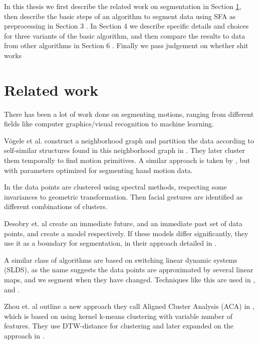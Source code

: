 In this thesis  we first describe the related work on segmentation in Section \ref{Related}, then describe the basic steps of an algorithm to segment data using SFA as preprocessing in Section 3 . In Section 4  we describe specific details and choices for three variants of the basic algorithm, and then compare the results to data from other algorithms in Section 6 . Finally we pass judgement on whether shit works 
\section{Related work}
\label{Related}
There has been a lot of work done on segmenting motions, ranging from different fields like computer graphics/visual recognition to machine learning.  

V{\"o}gele et al.  construct a neighborhood graph and partition the data according to self-similar structures found in this neighborhood graph in \cite{EfficientUnsupervised}. They later cluster them temporally to find motion primitives. A similar approach is taken by  \cite{Handsegmentation}, but with parameters optimized for segmenting hand motion data.

In \cite{facialsegmentation} the data points are clustered using spectral methods, respecting some invariances to geometric transformation. Then facial gestures are identified as different combinations of clusters.

Desobry et. al  create an immediate future, and an immediate past set of data points, and create a model respectively. If these models differ significantly, they use it as a boundary for segmentation, in their approach detailed in \cite{OnlineKernelChange}. 

A similar class of algorithms are based on switching linear dynamic systems (SLDS), as the name suggests the data points are approximated by several linear maps, and we segment when they have changed. Techniques like this are used in \cite{RepetitiveMotionAnalysis}, and \cite{NonparametricBayesian}. 

Zhou et. al outline a new approach they call Aligned Cluster Analysis (ACA) in \cite{ACA}, which is based on using kernel k-means clustering with variable number of features. They use DTW-distance for clustering and later expanded on the approach in \cite{HACA}.

